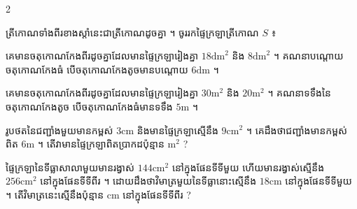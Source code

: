 \documentclass[theme=teal]{khmermath}
\def\splitnum#1#2{%
  \color{koreaNumber!65}#1\color{koreaOrange}#2%
}
\newcommand{\koreannum}[1]{%
  \ifstrempty{#1}{}{%
    \mbox{%
      \fontsize{15}{15}\selectfont\bfseries%
      \ifnum#1<10\relax%
        \color{koreaNumber!65}0\color{koreaOrange}#1%
      \else%
        \expandafter\splitnum#1%
      \fi%
    }\,\ %
  }%
}
\newcommand{\exhead}[1]{%
  \koreannum{#1}%
}
\begin{document}
\begin{multicols}{2}
  \noindent\begin{minipage}{\linewidth}
    \exhead{4} ត្រីកោណទាំងពីរខាងស្ដាំនេះជាត្រីកោណដូចគ្នា ។ ចូររកផ្ទៃក្រឡាត្រីកោណ $S$ ៖
    \begin{center}
      \vspace{-5pt}
    \end{center}
  \end{minipage}\par\vspace{5pt}

  \noindent\begin{minipage}{\linewidth}
    \exhead{5} គេមានចតុកោណកែងពីរដូចគ្នាដែលមានផ្ទៃក្រឡារៀងគ្នា $18\text{dm}^2$ និង $8\text{dm}^2$ ។ គណនាបណ្ដោយចតុកោណកែងធំ បើចតុកោណកែងតូចមានបណ្ដោយ $6\text{dm}$ ។
  \end{minipage}\par\vspace{5pt}

  \noindent\begin{minipage}{\linewidth}
    \exhead{6} គេមានចតុកោណកែងពីរដូចគ្នាដែលមានផ្ទៃក្រឡារៀងគ្នា $30\text{m}^2$ និង $20\text{m}^2$ ។ គណនាទទឹងនៃចតុកោណកែងតូច បើចតុកោណកែងធំមានទទឹង $5\text{m}$ ។
  \end{minipage}\par\vspace{5pt}

  \noindent\begin{minipage}{\linewidth}
    \exhead{7} រូបថតនៃជញ្ជាំងមួយមានកម្ពស់ $3\text{cm}$ និងមានផ្ទៃក្រឡាស្មើនឹង $9\text{cm}^2$ ។ គេដឹងថាជញ្ជាំងមានកម្ពស់ពិត $6\text{m}$ ។ តើវាមានផ្ទៃក្រឡាពិតប្រាកដប៉ុន្មាន $\text{m}^2$ ?
  \end{minipage}\par\vspace{5pt}

  \noindent\begin{minipage}{\linewidth}
    \exhead{8} ផ្ទៃក្រឡានៃទីធ្លាសាលាមួយមានរង្វាស់ $144\text{cm}^2$ នៅក្នុងផែនទីទីមួយ ហើយមានរង្វាស់ស្មើនឹង $256\text{cm}^2$ នៅក្នុងផែនទីទីពីរ ។ ដោយដឹងថាវិមាត្រមួយនៃទីធ្លានោះស្មើនឹង $18\text{cm}$ នៅក្នុងផែនទីទីមួយ ។ តើវិមាត្រនេះស្មើនឹងប៉ុន្មាន $\text{cm}$ នៅក្នុងផែនទីទីពីរ ?
  \end{minipage}\par\vspace{5pt}


\end{multicols}
\end{document}
